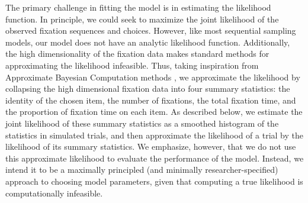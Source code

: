  
The primary challenge in fitting the model is in estimating the likelihood function. In principle, we could seek to maximize the joint likelihood of the observed fixation sequences and choices. However, like most sequential sampling models, our model does not have an analytic likelihood function. Additionally, the high dimensionality of the fixation data makes standard methods for approximating the likelihood \citep{turner2014generalized,opheusden2020unbiased} infeasible. Thus, taking inspiration from Approximate Bayesian Computation methods \citep{sunnaker2013approximate,csillery2010approximate}, we approximate the likelihood by collapsing the high dimensional fixation data into four summary statistics: the identity of the chosen item, the number of fixations, the total fixation time, and the proportion of fixation time on each item. As described below, we estimate the joint likelihood of these summary statistics as a smoothed histogram of the statistics in simulated trials, and then approximate the likelihood of a trial by the likelihood of its summary statistics. We emphasize, however, that we do not use this approximate likelihood to evaluate the performance of the model. Instead, we intend it to be a maximally principled (and minimally researcher-specified) approach to choosing model parameters, given that computing a true likelihood is computationally infeasible.


